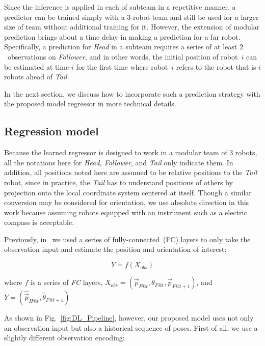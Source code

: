 \documentclass[letterpaper, 10 pt, conference]{ieeeconf}  %
\begin{document}
	Since the inference is applied in each of subteam in a repetitive manner,
	a predictor can be trained simply with a $3$-robot team and still be used for a larger
	size of team without additional training for it. However, the extension of
	modular prediction brings about a time delay in making a prediction for a far robot.
	Specifically, a prediction for \emph{Head} in a subteam requires a series of at least
	$2$~observations on \emph{Follower}, and in other words,
	the initial position of robot~$i$ can be estimated at time $i$ for the first time
	where robot~$i$ refers to the robot that is $i$ robots ahead of \emph{Tail}.

	In the next section, we discuss how to incorporate such a prediction strategy with
	the proposed model regressor in more technical details.


	\subsection{Regression model}
	\label{sec:regression_model}

	Because the learned regressor is designed to work in a modular team of $3$ robots,
	all the notations here for \emph{Head, Follower}, and \emph{Tail} only indicate
	them. In addition, all positions noted here are assumed to be relative positions
	to the \emph{Tail} robot, since in practice, the \emph{Tail} has to understand
	positions of others by projection onto the local coordinate system centered
	at itself. Though a similar conversion may be considered for orientation,
	we use absolute direction in this work because assuming robots equipped
	with an instrument such as a electric compass is acceptable.

	Previously, in~\cite{CPR17} we used a series of fully-connected~(FC) layers
	to only take the observation input and estimate the position and orientation
	of interest:

	\begin{equation}
	Y = f(X_{obs})
	\end{equation}

	\begin{flushleft}
	where $f$ is a series of \emph{FC} layers,
	$X_{obs} = (\vec{p}_{F@t}, \theta_{F@t}, \vec{p}_{F@t+1})$, and
	$Y = (\hat{\vec{p}}_{H@t}, \hat{\theta}_{F@t+1})$
	\end{flushleft}

	As shown in Fig.~\ref{fig:DL_Pipeline}, however, our proposed model uses not only
	an observation input but also a historical sequence of poses. First of all, we
	use a slightly different observation encoding:
\end{document}

